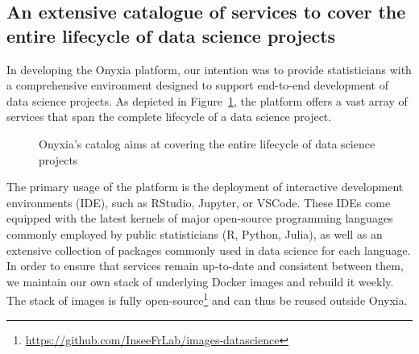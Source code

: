 \documentclass[graybox]{svmult}
\begin{document}
\subsection{An extensive catalogue of services to cover the entire lifecycle of data science projects}
\label{ssec:catalog}

In developing the Onyxia platform, our intention was to provide statisticians with a comprehensive environment designed to support end-to-end development of data science projects. As depicted in Figure~\ref{fig:onyxia-catalog}, the platform offers a vast array of services that span the complete lifecycle of a data science project.

\begin{figure}[htbp]
    \centering
    \caption{Onyxia's catalog aims at covering the entire lifecycle of data science projects}
    \label{fig:onyxia-catalog}
\end{figure}

The primary usage of the platform is the deployment of interactive development environments (IDE), such as RStudio, Jupyter, or VSCode. These IDEs come equipped with the latest kernels of major open-source programming languages commonly employed by public statisticians (R, Python, Julia), as well as an extensive collection of packages commonly used in data science for each language. In order to ensure that services remain up-to-date and consistent between them, we maintain our own stack of underlying Docker images and rebuild it weekly. The stack of images is fully open-source\footnote{\url{https://github.com/InseeFrLab/images-datascience}} and can thus be reused outside Onyxia.
\end{document}
